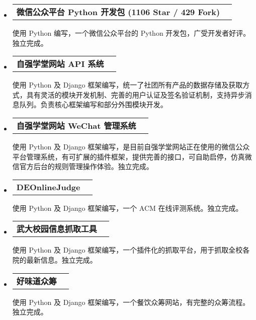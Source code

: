 \documentclass[a4paper,9pt]{article}
\makeatletter
\newcommand{\ressubheading}[2]{
  \begin{tabular*}{172mm}{l@{\extracolsep{\fill}}r}
    \textbf{#1} & #2
  \end{tabular*}\vspace{0pt}}
\makeatother
\begin{document}
\begin{itemize}
  
\item
  \ressubheading{微信公众平台 Python 开发包 (1106 Star / 429 Fork)}{\color{link}{https://github.com/doraemonext/wechat-python-sdk}}
  \begin{adjustwidth}{8mm}{8mm}
  \textnormal{使用 Python 编写，一个微信公众平台的 Python 开发包，广受开发者好评。独立完成。}
  \end{adjustwidth}

\item
  \ressubheading{自强学堂网站 API 系统}{}
  \begin{adjustwidth}{8mm}{8mm}
  \textnormal{使用 Python 及 Django 框架编写，统一了社团所有产品的数据存储及获取方式，具有灵活的模块开发机制、完善的用户认证及签名验证机制，支持异步消息队列。负责核心框架编写和部分外围模块开发。}
  \end{adjustwidth}

\item
  \ressubheading{自强学堂网站 WeChat 管理系统}{}
  \begin{adjustwidth}{8mm}{8mm}
  \textnormal{使用 Python 及 Django 框架编写，是目前自强学堂网站正在使用的微信公众平台管理系统，有可扩展的插件框架，提供完善的接口，可自助启停，仿真微信官方后台的规则管理操作体验。独立完成。}
  \end{adjustwidth}

\item
  \ressubheading{DEOnlineJudge}{\color{link}{https://github.com/doraemonext/DEOnlineJudge/}}
  \begin{adjustwidth}{8mm}{8mm}
  \textnormal{使用 Python 及 Django 框架编写，一个 ACM 在线评测系统。独立完成。}
  \end{adjustwidth}

\item
  \ressubheading{武大校园信息抓取工具}{\color{link}{https://github.com/doraemonext/zq\_monitor/}}
  \begin{adjustwidth}{8mm}{8mm}
  \textnormal{使用 Python 及 Django 框架编写，一个插件化的抓取平台，用于抓取全校各院的最新信息。独立完成。}
  \end{adjustwidth}

\item
  \ressubheading{好味道众筹}{\color{link}{https://github.com/doraemonext/citi/}}
  \begin{adjustwidth}{8mm}{8mm}
  \textnormal{使用 Python 及 Django 框架编写，一个餐饮众筹网站，有完整的众筹流程。独立完成。}
  \end{adjustwidth}


\end{itemize}
\end{document}
